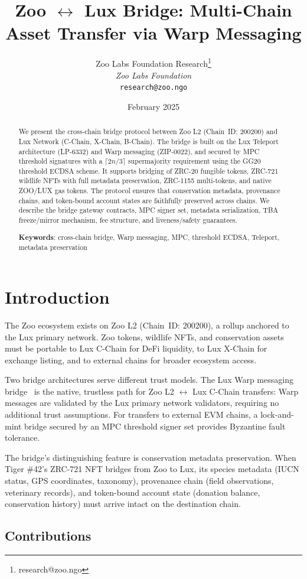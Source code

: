 \documentclass[11pt,letterpaper]{article}
\title{\textbf{Zoo $\leftrightarrow$ Lux Bridge: Multi-Chain Asset Transfer via Warp Messaging}}
\author{
Zoo Labs Foundation Research\thanks{research@zoo.ngo}\\
\textit{Zoo Labs Foundation}\\
\texttt{research@zoo.ngo}
}
\date{February 2025}
\begin{document}
\zoocoverpage

\begin{abstract}
We present the cross-chain bridge protocol between Zoo L2 (Chain~ID: 200200) and Lux Network (C-Chain, X-Chain, B-Chain). The bridge is built on the Lux Teleport architecture (LP-6332) and Warp messaging (ZIP-0022), and secured by MPC threshold signatures with a $\lceil 2n/3 \rceil$ supermajority requirement using the GG20 threshold ECDSA scheme. It supports bridging of ZRC-20 fungible tokens, ZRC-721 wildlife NFTs with full metadata preservation, ZRC-1155 multi-tokens, and native ZOO/LUX gas tokens. The protocol ensures that conservation metadata, provenance chains, and token-bound account states are faithfully preserved across chains. We describe the bridge gateway contracts, MPC signer set, metadata serialization, TBA freeze/mirror mechanism, fee structure, and liveness/safety guarantees.

\textbf{Keywords}: cross-chain bridge, Warp messaging, MPC, threshold ECDSA, Teleport, metadata preservation
\end{abstract}

\section{Introduction}

The Zoo ecosystem exists on Zoo L2 (Chain~ID: 200200), a rollup anchored to the Lux primary network. Zoo tokens, wildlife NFTs, and conservation assets must be portable to Lux C-Chain for DeFi liquidity, to Lux X-Chain for exchange listing, and to external chains for broader ecosystem access.

Two bridge architectures serve different trust models. The Lux Warp messaging bridge~\cite{warp2023} is the native, trustless path for Zoo L2 $\leftrightarrow$ Lux C-Chain transfers: Warp messages are validated by the Lux primary network validators, requiring no additional trust assumptions. For transfers to external EVM chains, a lock-and-mint bridge secured by an MPC threshold signer set provides Byzantine fault tolerance.

The bridge's distinguishing feature is conservation metadata preservation. When Tiger \#42's ZRC-721 NFT bridges from Zoo to Lux, its species metadata (IUCN status, GPS coordinates, taxonomy), provenance chain (field observations, veterinary records), and token-bound account state (donation balance, conservation history) must arrive intact on the destination chain.

\subsection{Contributions}
\end{document}
